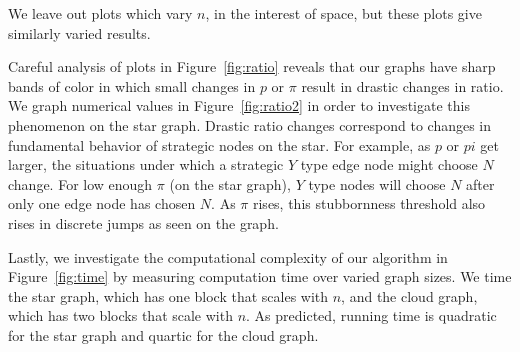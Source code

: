 \documentclass{article}
\begin{document}
We leave out plots which vary $n$, in the interest of space, but these plots give similarly varied results.

Careful analysis of plots in Figure~\ref{fig:ratio} reveals that our graphs have sharp bands of color in which small changes in $p$ or $\pi$ result in drastic changes in ratio. We graph numerical values in Figure~\ref{fig:ratio2} in order to investigate this phenomenon on the star graph. Drastic ratio changes correspond to changes in fundamental behavior of strategic nodes on the star. For example, as $p$ or $pi$ get larger, the situations under which a strategic $Y$ type edge node might choose $N$ change. For low enough $\pi$ (on the star graph), $Y$ type nodes will choose $N$ after only one edge node has chosen $N$. As $\pi$ rises, this stubbornness threshold also rises in discrete jumps as seen on the graph.

Lastly, we investigate the computational complexity of our algorithm in Figure~\ref{fig:time} by measuring computation time over varied graph sizes. We time the star graph, which has one block that scales with $n$, and the cloud graph, which has two blocks that scale with $n$. As predicted, running time is quadratic for the star graph and quartic for the cloud graph.
\end{document}
